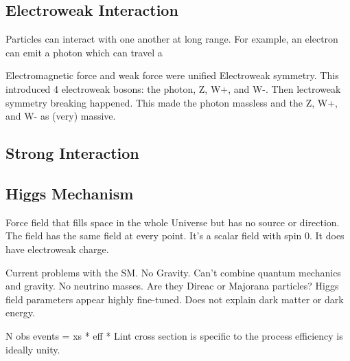 \subsection{Electroweak Interaction}
\label{subsec:ew_inter}

Particles can interact with one another at long range.
For example, an electron can emit a photon which can travel a 

Electromagnetic force and weak force were unified Electroweak symmetry.
This introduced 4 electroweak bosons: the photon, Z, W+, and W-.
Then lectroweak symmetry breaking happened.
This made the photon massless and the Z, W+, and W- as (very) massive.

\subsection{Strong Interaction}
\label{subsec:strong_inter}

\subsection{Higgs Mechanism}
\label{subsec:higgs_mech}

Force field that fills space in the whole Universe but has no source or direction.
The field has the same field at every point.
It's a scalar field with spin 0.
It does have electroweak charge.

Current problems with the SM.
No Gravity. Can't combine quantum mechanics and gravity.
No neutrino masses. Are they Direac or Majorana particles?
Higgs field parameters appear highly fine-tuned.
Does not explain dark matter or dark energy.

N obs events = xs * eff * Lint 
cross section is specific to the process
efficiency is ideally unity.
